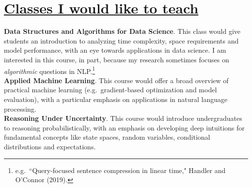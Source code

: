 \documentclass{article}
\begin{document}
\section*{\underline{\normalsize Classes I would like to teach}}

\textbf{Data Structures and Algorithms for Data Science}. This class would give students an introduction to analyzing time complexity, space requirements and model performance, with an eye towards applications in data science. I am interested in this course, in part, because my research sometimes focuses on \textit{algorithmic} questions in NLP.\footnote{e.g.\  ``Query-focused sentence compression in linear time," Handler and O'Connor (2019).} \\

\noindent \textbf{Applied Machine Learning}. This course would offer a broad overview of practical machine learning (e.g.\ gradient-based optimization and model evaluation), with a particular emphasis on applications in natural language processing. \\ 

\noindent \textbf{Reasoning Under Uncertainty}. This course would introduce undergraduates to reasoning probabilistically, with an emphasis on developing deep intuitions for fundamental concepts like state spaces, random variables, conditional distributions and expectations. \\ 


\end{document}
